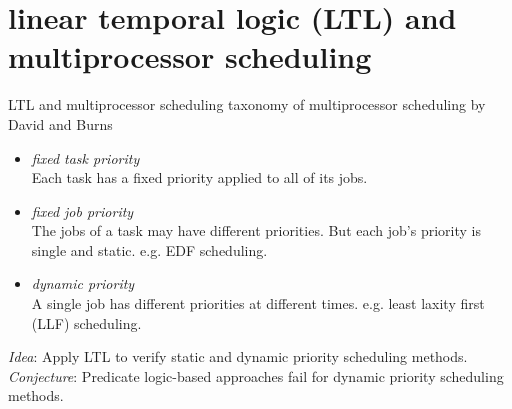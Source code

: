 \documentclass{beamer}
\begin{document}

			
	\section{linear temporal logic (LTL) and multiprocessor scheduling}
	
	\begin{frame}{LTL and multiprocessor scheduling}
		taxonomy of multiprocessor scheduling by David and Burns \cite{DB2011}
		\begin{itemize}
			\item \emph{fixed task priority}\\ 
			Each task has a fixed priority  applied to all of its jobs. 
			\item \emph{fixed job priority}\\
			The jobs of a task may have different priorities. But each job's priority is single and static. e.g. EDF scheduling.
			\item \emph{dynamic priority}\\
			A single job has different priorities  at different times. e.g.  least laxity first (LLF) scheduling.	
		\end{itemize}
	
	\emph{Idea}: Apply LTL to verify static and dynamic priority scheduling methods.\\
	\emph{Conjecture}: Predicate logic-based approaches fail for dynamic priority scheduling methods. 	
	\end{frame}
	
\end{document}
